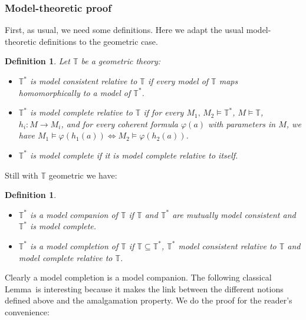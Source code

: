 \documentclass{article}
\newtheorem{definition}[theorem]{Definition}
\newcommand{\T}{\mathbb{T}}
\renewcommand{\phi}{\varphi}
\begin{document}
\subsubsection{Model-theoretic proof}
First, as usual, we need some definitions. Here we adapt the usual model-theoretic definitions to the geometric case. 

\begin{definition}
Let $\T$ be a geometric theory: 
\begin{itemize}
    \item $\T^*$ is model consistent relative to $\T$ if every model of $\T$ maps homomorphically to a model of $\T^*$.
    \item $\T^*$ is model complete relative to $\T$ if for every $M_1,\,M_2\models\T^*$, $M\models\T$, $h_i:M\xrightarrow{}M_i$, and for every coherent formula $\phi(a)$ with parameters in $M$, we have $M_1\models\phi(h_1(a))\Leftrightarrow M_2\models \phi(h_2(a))$.
    \item $\T^*$ is model complete if it is model complete relative to itself.
\end{itemize}
\end{definition}

Still with $\T$ geometric we have:

\begin{definition}\label{standard}
\begin{itemize}
    \item $\T^*$ is a model companion of $\T$ if $\T$ and $\T^*$ are mutually model consistent and $\T^*$ is model complete.
    \item $\T^*$ is a model completion of $\T$ if $\T\subseteq\T^*$, $\T^*$ model consistent relative to $\T$ and model complete relative to $\T$.
\end{itemize}
\end{definition}

Clearly a model completion is a model companion. The following classical Lemma~is interesting because it makes the link between the different notions defined above and the amalgamation property. We do the proof for the reader's convenience:
\end{document}
